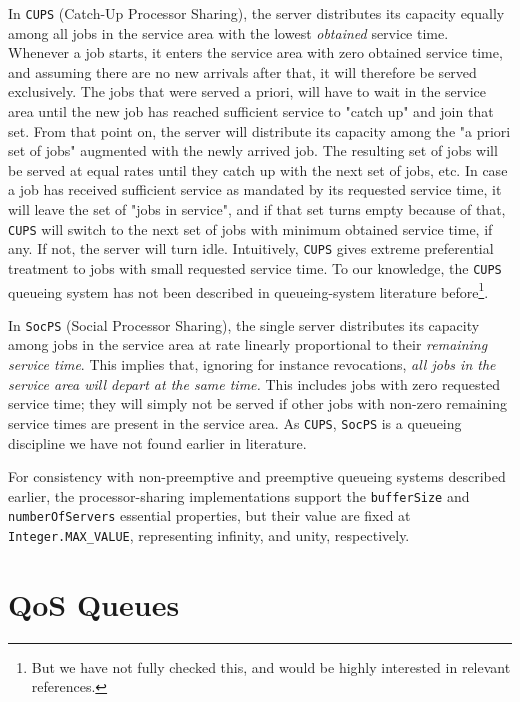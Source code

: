 In \lstinline|CUPS| (Catch-Up Processor Sharing),
  the server distributes its capacity equally
  among all jobs in the service area with the
  lowest {\em obtained\/} service time.
Whenever a job starts,
  it enters the service area
  with zero obtained service time,
  and assuming there are no new arrivals after that,
  it will therefore be served exclusively.
The jobs that were served a priori,
  will have to wait in the service area
  until the new job has reached sufficient
  service to "catch up"
  and join that set.
From that point on,
  the server will distribute its capacity among
  the "a priori set of jobs" augmented with the
  newly arrived job.
The resulting set of jobs
  will be served at equal rates
  until they catch up with the next set of jobs,
  etc.
In case a job has received sufficient
  service as mandated by its requested service time,
  it will leave the set of "jobs in service",
  and if that set turns empty because of that,
  \lstinline|CUPS| will switch to the next
  set of jobs with minimum obtained service time,
  if any.
If not,
  the server will turn idle.
Intuitively,
  \lstinline|CUPS| gives extreme preferential
  treatment to jobs with small requested service time.
To our knowledge,
  the \lstinline|CUPS| queueing system has not been
  described in queueing-system literature before\footnote{
  But we have not fully checked this,
  and would be highly interested in relevant references.}.

In \lstinline|SocPS| (Social Processor Sharing),
  the single server distributes its capacity
  among jobs in the service area
  at rate linearly proportional to their
  {\em remaining service time}.
This implies that,
  ignoring for instance revocations,
  {\em all jobs in the service area will depart at the same time.}
This includes jobs with zero requested service time;
  they will simply not be served if other jobs
  with non-zero remaining service times are present
  in the service area.
As \lstinline|CUPS|, \lstinline|SocPS| is
  a queueing discipline we have not found earlier
  in literature.
  
For consistency with
  non-preemptive and preemptive queueing systems
  described earlier,
  the processor-sharing implementations support the
  \lstinline|bufferSize|
  and \lstinline|numberOfServers|
  essential properties,
  but their value are fixed
  at
  \lstinline|Integer.MAX_VALUE|,
  representing infinity,
  and unity,
  respectively.
  
\section{QoS Queues}
\label{sec:qos-queues}


